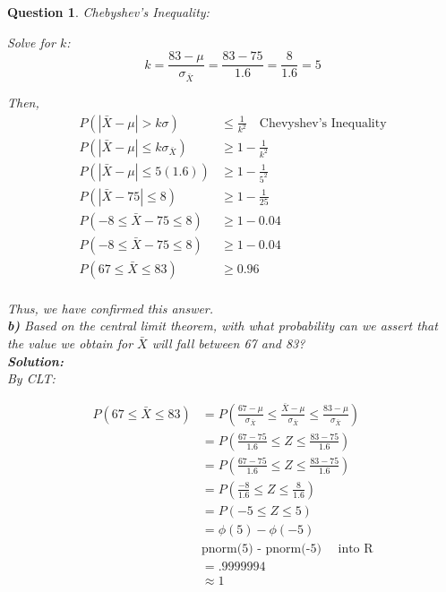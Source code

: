 \documentclass{article}
\theoremstyle{questionstyle}
\newtheorem{myquestion}{Question}
\begin{document}
\begin{myquestion}
Chebyshev's Inequality:

Solve for \( k \): \[ k = \frac{83 - \mu}{\sigma_{\bar{X}}} = \frac{83 - 75}{1.6} = \frac{8}{1.6} = 5\]

Then,
\begin{align*}
    P(|\bar{X} - \mu | > k\sigma ) &\leq \frac{1}{k^2} \quad \text{Chevyshev's Inequality}\\
    P(|\bar{X} - \mu | \leq k\sigma_{\bar{X}} ) &\geq 1- \frac{1}{k^2} \\
    P(|\bar{X} - \mu | \leq 5(1.6) ) &\geq 1- \frac{1}{5^2} \\
    P(|\bar{X} - 75 | \leq 8 ) &\geq 1- \frac{1}{25} \\
    P( -8 \leq \bar{X} - 75 \leq 8 ) &\geq 1- 0.04 \\
    P( -8 \leq \bar{X} - 75 \leq 8 ) &\geq 1- 0.04 \\
    P( 67 \leq \bar{X} \leq 83 ) &\geq 0.96\\
\end{align*}

Thus, we have confirmed this answer.\\ 

 \textbf{b)} Based on the central limit theorem, with what probability can we assert that the value we obtain for \(\bar{X}\) will fall between 67 and 83?\\

\textbf{Solution:}\\

By CLT:

\begin{align*}
    P(67 \leq \bar{X} \leq 83) &= P\left( \frac{67 - \mu}{\sigma_{\bar{X}}} \leq \frac{\bar{X} - \mu}{\sigma_{\bar{X}}} \leq \frac{83 - \mu}{\sigma_{\bar{X}}}\right)\\
    &= P\left( \frac{67 - 75}{1.6} \leq Z \leq \frac{83 - 75}{1.6}\right)\\
    &=  P\left( \frac{67 - 75}{1.6} \leq Z \leq \frac{83 - 75}{1.6}\right)\\
    &= P\left( \frac{-8}{1.6} \leq Z \leq \frac{8}{1.6}\right)\\
    &= P\left( -5 \leq Z \leq 5 \right)\\ 
    &= \phi(5) - \phi(-5)\\
    & \text{pnorm(5) - pnorm(-5)} \quad \text{ into R}\\
    &= .9999994 \\ 
    &\approx 1
\end{align*}



\end{myquestion}
\end{document}
